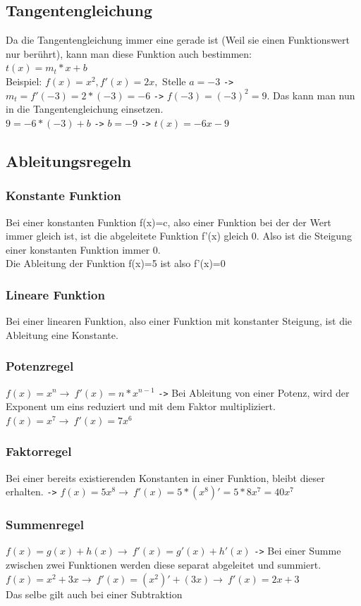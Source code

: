 \documentclass{article}
\begin{document}
	\subsection{Tangentengleichung}
	Da die Tangentengleichung immer eine gerade ist (Weil sie einen Funktionswert nur berührt), kann man diese Funktion auch bestimmen: \\
	$t(x)=m_t*x+b$ \\
	Beispiel: $f(x)=x^2, f'(x)=2x,$ Stelle $a=-3$ \verb|->| $m_t=f'(-3)=2*(-3)=-6$ \verb|->| $f(-3)=(-3)^2=9$. Das kann man nun in die Tangentengleichung einsetzen. \\
	$9=-6*(-3)+b$ \verb|->| $b=-9$ \verb|->| $t(x)=-6x-9$
	\subsection{Ableitungsregeln}
	\subsubsection{Konstante Funktion}
	Bei einer konstanten Funktion f(x)=c, also einer Funktion bei der der Wert immer gleich ist, ist die abgeleitete Funktion f'(x) gleich 0. Also ist die Steigung einer konstanten Funktion immer 0. \\
	Die Ableitung der Funktion f(x)=5 ist also f'(x)=0 \\
	\subsubsection{Lineare Funktion}
	Bei einer linearen Funktion, also einer Funktion mit konstanter Steigung, ist die Ableitung eine Konstante.
	\subsubsection{Potenzregel}
	$f(x)=x^n\to\ f'(x)=n*x^{n-1}$ \verb|->| Bei Ableitung von einer Potenz, wird der Exponent um eins reduziert und mit dem Faktor multipliziert. \\
	$f(x)=x^7 \to\ f'(x)=7x^6$
	\subsubsection{Faktorregel}
	Bei einer bereits existierenden Konstanten in einer Funktion, bleibt dieser erhalten. \verb|->| $f(x)=5x^8\to\ f'(x)=5*(x^8)'=5*8x^7=40x^7$ 
	\subsubsection{Summenregel}
	$f(x)=g(x)+h(x)\to\ f'(x)=g'(x)+h'(x)$ \verb|->| Bei einer Summe zwischen zwei Funktionen werden diese separat abgeleitet und summiert. \\
	$f(x)=x^2+3x\to\ f'(x)=(x^2)'+(3x)\to\ f'(x)=2x+3$\\
	Das selbe gilt auch bei einer Subtraktion
\end{document}
